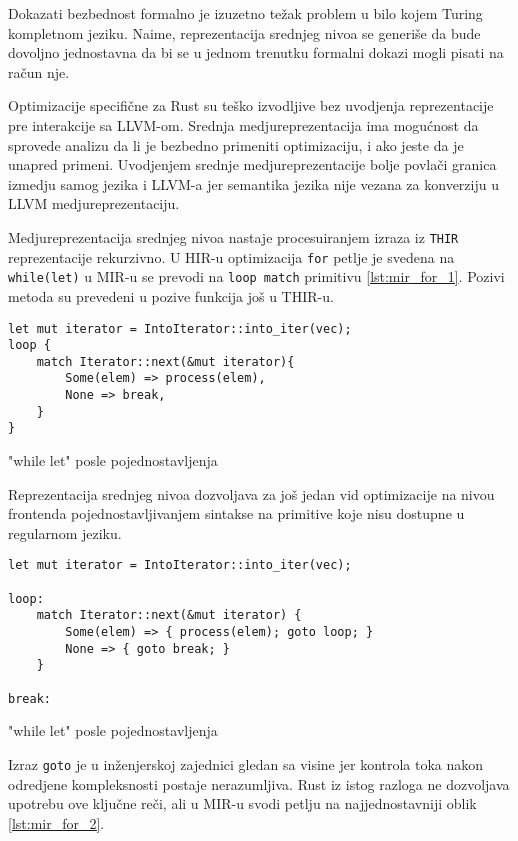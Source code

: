 Dokazati bezbednost formalno je izuzetno težak 
problem u bilo kojem Turing kompletnom jeziku. Naime, reprezentacija srednjeg nivoa se generiše da bude dovoljno jednostavna 
da bi se u jednom trenutku formalni dokazi mogli pisati na račun nje. 

Optimizacije specifične za Rust su teško izvodljive bez uvodjenja reprezentacije pre interakcije sa LLVM-om. Srednja medjureprezentacija 
ima mogućnost da sprovede analizu da li je bezbedno primeniti optimizaciju, i ako jeste da je unapred primeni. Uvodjenjem srednje medjureprezentacije bolje povlači granica izmedju samog jezika i LLVM-a jer 
semantika jezika nije vezana za konverziju u LLVM medjureprezentaciju.


Medjureprezentacija srednjeg nivoa nastaje procesuiranjem izraza iz \verb|THIR| reprezentacije rekurzivno.
U HIR-u optimizacija \verb|for| petlje je svedena na \verb|while(let)| u MIR-u se prevodi na \verb|loop match| 
primitivu \ref{lst:mir_for_1}.  Pozivi metoda su prevedeni u pozive funkcija još u THIR-u.

\begin{listing}[H]
\begin{verbatim}
let mut iterator = IntoIterator::into_iter(vec);
loop {
    match Iterator::next(&mut iterator){
        Some(elem) => process(elem),
        None => break,
    }
}
\end{verbatim}
\caption{"while let" posle pojednostavljenja}
\label{lst:mir_for_1}
\end{listing}

Reprezentacija srednjeg nivoa dozvoljava za još jedan vid optimizacije na nivou frontenda pojednostavljivanjem
sintakse na primitive koje nisu dostupne u regularnom jeziku.

\begin{listing}[H]
\begin{verbatim}
let mut iterator = IntoIterator::into_iter(vec);

loop:
    match Iterator::next(&mut iterator) {
        Some(elem) => { process(elem); goto loop; }
        None => { goto break; }
    }

break:
\end{verbatim}
\caption{"while let" posle pojednostavljenja}
\label{lst:mir_for_2}
\end{listing}

Izraz \verb|goto| je u inženjerskoj zajednici gledan sa visine jer kontrola toka nakon odredjene kompleksnosti
postaje nerazumljiva. Rust iz istog razloga ne dozvoljava upotrebu ove ključne reči, ali u MIR-u svodi 
petlju na najjednostavniji oblik \ref{lst:mir_for_2}.

